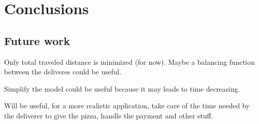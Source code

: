 \documentclass[10pt]{article}
\begin{document}
	\section{Conclusions} 

	\subsection{Future work}
	\label{Future work}
	Only total traveled distance is minimized (for now). Maybe a balancing 
	function between the deliveres could be useful.

	Simplify the model could be useful because it may leads to time decreasing.
	

	Will be useful, for a more realistic application, take care of the time 
	needed by the deliverer to give the pizza, handle the payment and other stuff. 



	
\end{document}
